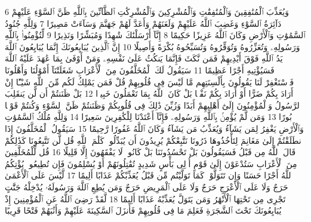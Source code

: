 {\tiny\colorbox{cl_aya}{6}} وَيُعَذِّبَ ٱلْمُنَٰفِقِينَ وَٱلْمُنَٰفِقَٰتِ وَٱلْمُشْرِكِينَ وَٱلْمُشْرِكَٰتِ ٱلظَّآنِّينَ بِٱللَّهِ ظَنَّ ٱلسَّوْءِ عَلَيْهِمْ دَآئِرَةُ ٱلسَّوْءِ وَغَضِبَ ٱللَّهُ عَلَيْهِمْ وَلَعَنَهُمْ وَأَعَدَّ لَهُمْ جَهَنَّمَ وَسَآءَتْ مَصِيرًا
{\tiny\colorbox{cl_aya}{7}} وَلِلَّهِ جُنُودُ ٱلسَّمَٰوَٰتِ وَٱلْأَرْضِ وَكَانَ ٱللَّهُ عَزِيزًا حَكِيمًا
{\tiny\colorbox{cl_aya}{8}} إِنَّآ أَرْسَلْنَٰكَ شَٰهِدًا وَمُبَشِّرًا وَنَذِيرًا
{\tiny\colorbox{cl_aya}{9}} لِّتُؤْمِنُوا۟ بِٱللَّهِ وَرَسُولِهِۦ وَتُعَزِّرُوهُ وَتُوَقِّرُوهُ وَتُسَبِّحُوهُ بُكْرَةً وَأَصِيلًا
{\tiny\colorbox{cl_aya}{10}} إِنَّ ٱلَّذِينَ يُبَايِعُونَكَ إِنَّمَا يُبَايِعُونَ ٱللَّهَ يَدُ ٱللَّهِ فَوْقَ أَيْدِيهِمْ فَمَن نَّكَثَ فَإِنَّمَا يَنكُثُ عَلَىٰ نَفْسِهِۦ وَمَنْ أَوْفَىٰ بِمَا عَٰهَدَ عَلَيْهُ ٱللَّهَ فَسَيُؤْتِيهِ أَجْرًا عَظِيمًا
{\tiny\colorbox{cl_aya}{11}} سَيَقُولُ لَكَ ٱلْمُخَلَّفُونَ مِنَ ٱلْأَعْرَابِ شَغَلَتْنَآ أَمْوَٰلُنَا وَأَهْلُونَا فَٱسْتَغْفِرْ لَنَا يَقُولُونَ بِأَلْسِنَتِهِم مَّا لَيْسَ فِى قُلُوبِهِمْ قُلْ فَمَن يَمْلِكُ لَكُم مِّنَ ٱللَّهِ شَيْـًٔا إِنْ أَرَادَ بِكُمْ ضَرًّا أَوْ أَرَادَ بِكُمْ نَفْعًۢا بَلْ كَانَ ٱللَّهُ بِمَا تَعْمَلُونَ خَبِيرًۢا
{\tiny\colorbox{cl_aya}{12}} بَلْ ظَنَنتُمْ أَن لَّن يَنقَلِبَ ٱلرَّسُولُ وَٱلْمُؤْمِنُونَ إِلَىٰٓ أَهْلِيهِمْ أَبَدًا وَزُيِّنَ ذَٰلِكَ فِى قُلُوبِكُمْ وَظَنَنتُمْ ظَنَّ ٱلسَّوْءِ وَكُنتُمْ قَوْمًۢا بُورًا
{\tiny\colorbox{cl_aya}{13}} وَمَن لَّمْ يُؤْمِنۢ بِٱللَّهِ وَرَسُولِهِۦ فَإِنَّآ أَعْتَدْنَا لِلْكَٰفِرِينَ سَعِيرًا
{\tiny\colorbox{cl_aya}{14}} وَلِلَّهِ مُلْكُ ٱلسَّمَٰوَٰتِ وَٱلْأَرْضِ يَغْفِرُ لِمَن يَشَآءُ وَيُعَذِّبُ مَن يَشَآءُ وَكَانَ ٱللَّهُ غَفُورًا رَّحِيمًا
{\tiny\colorbox{cl_aya}{15}} سَيَقُولُ ٱلْمُخَلَّفُونَ إِذَا ٱنطَلَقْتُمْ إِلَىٰ مَغَانِمَ لِتَأْخُذُوهَا ذَرُونَا نَتَّبِعْكُمْ يُرِيدُونَ أَن يُبَدِّلُوا۟ كَلَٰمَ ٱللَّهِ قُل لَّن تَتَّبِعُونَا كَذَٰلِكُمْ قَالَ ٱللَّهُ مِن قَبْلُ فَسَيَقُولُونَ بَلْ تَحْسُدُونَنَا بَلْ كَانُوا۟ لَا يَفْقَهُونَ إِلَّا قَلِيلًا
{\tiny\colorbox{cl_aya}{16}} قُل لِّلْمُخَلَّفِينَ مِنَ ٱلْأَعْرَابِ سَتُدْعَوْنَ إِلَىٰ قَوْمٍ أُو۟لِى بَأْسٍ شَدِيدٍ تُقَٰتِلُونَهُمْ أَوْ يُسْلِمُونَ فَإِن تُطِيعُوا۟ يُؤْتِكُمُ ٱللَّهُ أَجْرًا حَسَنًا وَإِن تَتَوَلَّوْا۟ كَمَا تَوَلَّيْتُم مِّن قَبْلُ يُعَذِّبْكُمْ عَذَابًا أَلِيمًا
{\tiny\colorbox{cl_aya}{17}} لَّيْسَ عَلَى ٱلْأَعْمَىٰ حَرَجٌ وَلَا عَلَى ٱلْأَعْرَجِ حَرَجٌ وَلَا عَلَى ٱلْمَرِيضِ حَرَجٌ وَمَن يُطِعِ ٱللَّهَ وَرَسُولَهُۥ يُدْخِلْهُ جَنَّٰتٍ تَجْرِى مِن تَحْتِهَا ٱلْأَنْهَٰرُ وَمَن يَتَوَلَّ يُعَذِّبْهُ عَذَابًا أَلِيمًا
{\tiny\colorbox{cl_aya}{18}} لَّقَدْ رَضِىَ ٱللَّهُ عَنِ ٱلْمُؤْمِنِينَ إِذْ يُبَايِعُونَكَ تَحْتَ ٱلشَّجَرَةِ فَعَلِمَ مَا فِى قُلُوبِهِمْ فَأَنزَلَ ٱلسَّكِينَةَ عَلَيْهِمْ وَأَثَٰبَهُمْ فَتْحًا قَرِيبًا
